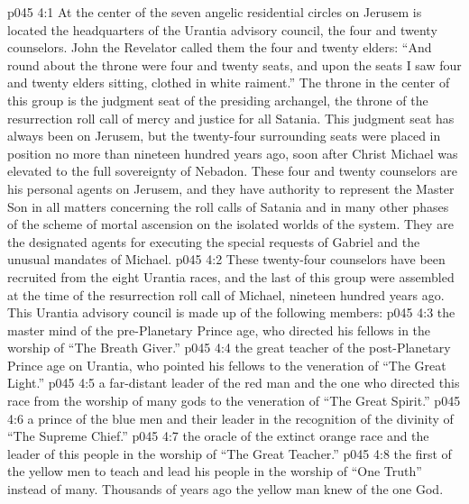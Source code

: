 \vs p045 4:1 At the center of the seven angelic residential circles on Jerusem is located the headquarters of the Urantia advisory council, the four and twenty counselors. John the Revelator called them the four and twenty elders: “And round about the throne were four and twenty seats, and upon the seats I saw four and twenty elders sitting, clothed in white raiment.” The throne in the center of this group is the judgment seat of the presiding archangel, the throne of the resurrection roll call of mercy and justice for all Satania. This judgment seat has always been on Jerusem, but the twenty\hyp{}four surrounding seats were placed in position no more than nineteen hundred years ago, soon after Christ Michael was elevated to the full sovereignty of Nebadon. These four and twenty counselors are his personal agents on Jerusem, and they have authority to represent the Master Son in all matters concerning the roll calls of Satania and in many other phases of the scheme of mortal ascension on the isolated worlds of the system. They are the designated agents for executing the special requests of Gabriel and the unusual mandates of Michael.
\vs p045 4:2 These twenty\hyp{}four counselors have been recruited from the eight Urantia races, and the last of this group were assembled at the time of the resurrection roll call of Michael, nineteen hundred years ago. This Urantia advisory council is made up of the following members:
\pc \vs p045 4:3 \bibnobreakspace {} the master mind of the pre\hyp{}Planetary Prince age, who directed his fellows in the worship of “The Breath Giver.”
\pc \vs p045 4:4 \bibnobreakspace {} the great teacher of the post\hyp{}Planetary Prince age on Urantia, who pointed his fellows to the veneration of “The Great Light.”
\pc \vs p045 4:5 \bibnobreakspace {} a far\hyp{}distant leader of the red man and the one who directed this race from the worship of many gods to the veneration of “The Great Spirit.”\plusone
\pc \vs p045 4:6 \bibnobreakspace {} a prince of the blue men and their leader in the recognition of the divinity of “The Supreme Chief.”
\pc \vs p045 4:7 \bibnobreakspace {} the oracle of the extinct orange race and the leader of this people in the worship of “The Great Teacher.”
\pc \vs p045 4:8 \bibnobreakspace {} the first of the yellow men to teach and lead his people in the worship of “One Truth” instead of many. Thousands of years ago the yellow man knew of the one God.
